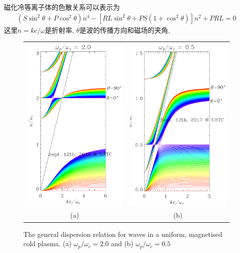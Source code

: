 \documentclass{article}
\begin{document}
	磁化冷等离子体的色散关系可以表示为\citep{Diver2001}
	\begin{align}
		\left(S \sin^2 \theta + P \cos^2 \theta\right) n^4 - \left[R L \sin^2 \theta
		+ P S \left(1 + \cos^2 \theta\right) \right] n^2 + P R L= 0 \label{Eqn:Colp}
	\end{align}
	这里$n = k c / \omega$是折射率, $\theta$是波的传播方向和磁场的夹角,
	\begin{figure}[htb]
		\begin{tabular}{cc}
			\includegraphics[width=.5\textwidth]{coldp_2_0.eps} &
			\includegraphics[width=.5\textwidth]{coldp_0_5.eps}
			\\
			(a) & (b)
		\end{tabular}
		\caption{The general dispersion relation for waves in a uniform, magnetised cold
			plasma. (a) $\omega_p / \omega_c = 2.0$ and (b) $\omega_p / \omega_c = 0.5$} \label{ColdPlasma}
	\end{figure}
\end{document}

